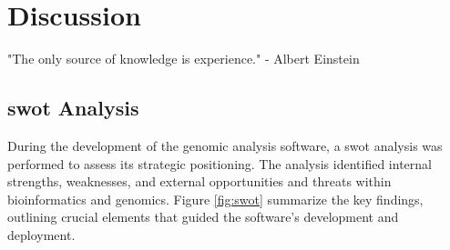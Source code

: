 \chapter{Discussion}
\label{chapter:Discussion}

\begin{introduction}
    "The only source of knowledge is experience." - Albert Einstein
\end{introduction}


\section{\acs{swot} Analysis} \label{sec:intro_swot}

During the development of the genomic analysis software, a \ac{swot} analysis was performed to assess its strategic positioning. The analysis identified internal strengths, weaknesses, and external opportunities and threats within bioinformatics and genomics. Figure \ref{fig:swot} summarize the key findings, outlining crucial elements that guided the software's development and deployment.


